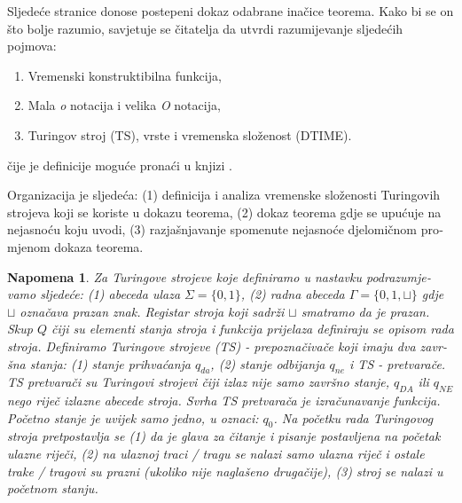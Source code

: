 \documentclass[12pt]{rectors}
\newtheorem{remark}{Napomena}[section]
\begin{document}
\begin{otherlanguage}{croatian}
Sljedeće stranice donose postepeni dokaz odabrane inačice teorema.
 Kako bi se on što bolje razumio, savjetuje se čitatelja da utvrdi razumijevanje sljedećih pojmova:
\begin{enumerate}
    \item Vremenski konstruktibilna funkcija,
    \item Mala \textit{o} notacija i velika \textit{O} notacija,
    \item Turingov stroj (TS), vrste i vremenska složenost (DTIME).
\end{enumerate}
čije je definicije moguće pronaći u knjizi \cite{sipser2006}.

Organizacija je sljedeća:
 (1) definicija i analiza vremenske složenosti Turingovih strojeva koji se koriste u dokazu teorema, (2)
 dokaz teorema gdje se upućuje na nejasnoću koju uvodi, (3) razjašnjavanje spomenute nejasnoće djelomičnom promjenom dokaza teorema.


\begin{remark}
Za Turingove strojeve koje definiramo u nastavku podrazumjevamo sljedeće: (1) abeceda ulaza $\Sigma = \{ 0, 1\}$, (2) radna abeceda $\Gamma = \{ 0,1, \sqcup \}$ gdje 
$\sqcup$ označava prazan znak.
Registar stroja koji sadrži $\sqcup$ smatramo da je prazan.
Skup $Q$ čiji su elementi stanja stroja i funkcija prijelaza definiraju se opisom rada stroja. Definiramo Turingove strojeve (TS) - prepoznačivače koji imaju dva završna stanja: (1) stanje prihvaćanja $q_{da}$, (2) stanje odbijanja $q_{ne}$ i
TS - pretvarače.
TS pretvarači su Turingovi strojevi čiji izlaz nije samo završno stanje, $q_{DA}$ ili $q_{NE}$ nego riječ izlazne abecede stroja. Svrha TS pretvarača je
izračunavanje funkcija.
Početno stanje je uvijek samo jedno, u oznaci: $q_0$.
\newline
Na početku rada Turingovog stroja pretpostavlja se (1) da je glava za čitanje i pisanje postavljena na početak ulazne riječi, (2) na ulaznoj traci / tragu se nalazi samo 
ulazna riječ i ostale trake / tragovi su prazni (ukoliko nije naglašeno drugačije),
(3) stroj se nalazi u početnom stanju.\newline
\end{remark}


\end{otherlanguage}
\end{document}

